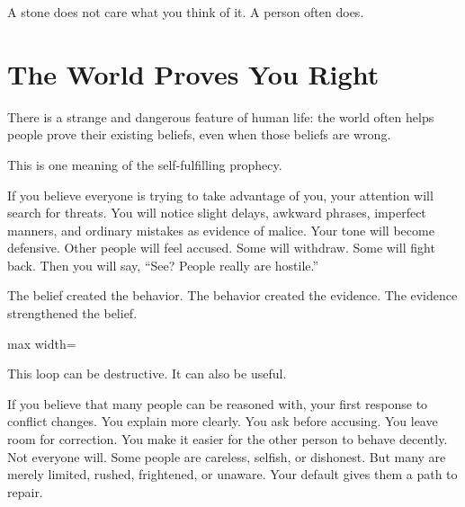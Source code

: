 A stone does not care what you think of it. A person often does.

\section*{The World Proves You Right}

There is a strange and dangerous feature of human life: the world often helps people prove their existing beliefs, even when those beliefs are wrong.

This is one meaning of the self-fulfilling prophecy.

If you believe everyone is trying to take advantage of you, your attention will search for threats. You will notice slight delays, awkward phrases, imperfect manners, and ordinary mistakes as evidence of malice. Your tone will become defensive. Other people will feel accused. Some will withdraw. Some will fight back. Then you will say, ``See? People really are hostile.''

The belief created the behavior. The behavior created the evidence. The evidence strengthened the belief.

\begin{center}
\begin{adjustbox}{max width=\linewidth}
\end{adjustbox}
\end{center}

This loop can be destructive. It can also be useful.

If you believe that many people can be reasoned with, your first response to conflict changes. You explain more clearly. You ask before accusing. You leave room for correction. You make it easier for the other person to behave decently. Not everyone will. Some people are careless, selfish, or dishonest. But many are merely limited, rushed, frightened, or unaware. Your default gives them a path to repair.

